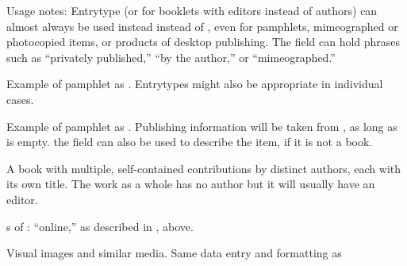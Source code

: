\documentclass{ltxdockit}[2010/02/12]
\begin{document}
\begin{typelist}
Usage notes: Entrytype  (or  for booklets with editors instead of authors) can almost always be used instead instead of , even for pamphlets, mimeographed or photocopied items, or products of desktop publishing. The  field can hold phrases such as ``privately published,'' ``by the author,'' or ``mimeographed.''

Example of pamphlet as .\autocites[Here is a government pamphlet, entered and formatted as , using the  and  fields for the government division and the pamphlet number, and the  field for the state board:][]{992book} Entrytypes  might also be appropriate in individual cases.

Example of pamphlet as . Publishing information will be taken from , as long as  is empty. the field  can also be used to describe the item, if it is not a book.\autocites[Same pamphlet as in the previous note, but entered as a {booklet}, with ``pamphlet'' in the type field, and the board and division, etc., in the howpublished field:][]{992booklet} 


 A book with multiple, self-contained contributions by distinct authors, each with its own title. The work as a whole has no author but it will usually have an editor. 

s of : ``online,'' as described in , above.






Visual images and similar media. Same data entry and formatting as 



\end{typelist}
\end{document}
